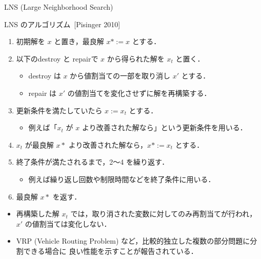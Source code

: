 \documentclass[11pt,dvipdfmx,handout]{beamer}
\begin{document}
\begin{frame}{LNS (Large Neighborhood Search)}
  \begin{block}{LNS のアルゴリズム~[Pisinger 2010]}
    \begin{enumerate}
      \compress
      \item 初期解を $x$ と置き，最良解 $x* := x$ とする．
      \item 以下のdestroy と repairで $x$ から得られた解を $x_t$ と置く．
      \begin{itemize}
        \compress
      \item destroy は $x$ から値割当ての一部を取り消し $x'$ とする．
      \item repair は $x'$ の\alert{値割当てを変化させずに解を再構築}する．
      \end{itemize}
      \item 更新条件を満たしていたら $x := x_t$ とする．
      \begin{itemize}
        \item 例えば「$x_t$ が $x$ より改善された解なら」という更新条件を用いる．
      \end{itemize}
      \item $x_t$ が最良解 $x*$ より改善された解なら，$x* := x_t$ とする．
      \item 終了条件が満たされるまで，2〜4 を繰り返す．
      \begin{itemize}
        \item 例えば繰り返し回数や制限時間などを終了条件に用いる．
      \end{itemize}
      \item 最良解 $x*$ を返す．
    \end{enumerate}
  \end{block}
  \begin{itemize}
    \item 再構築した解 $x_t$ では，取り消された変数に対してのみ再割当てが行われ，$x'$ の値割当ては変化しない．
    \item VRP (Vehicle Routing Problem) など，比較的独立した複数の部分問題に分割できる場合に
          良い性能を示すことが報告されている．
  \end{itemize}
\end{frame}
\end{document}
